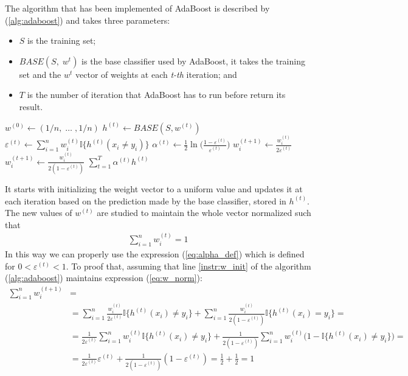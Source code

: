 The algorithm that has been implemented of AdaBoost is described by (\ref{alg:adaboost}) and takes three parameters:
\begin{itemize}
	\item $S$ is the training set;
	\item $BASE(S,\;w^{t})$ is the base classifier used by AdaBoost, it takes the training set and the $w^{t}$ vector of weights at each \textit{t-th} iteration; and
	\item $T$ is the number of iteration that AdaBoost has to run before return its result.
\end{itemize}
\begin{algorithm}[htpb]
	\caption{}
	\label{alg:adaboost}
	\begin{algorithmic}[1]
		\State $w^{(0)} \gets (1/n,\;\dots\;,1/n)$ \label{instr:w_init}
			\State $h^{(t)} \gets BASE(S, w^{(t)})$
			\State $\varepsilon^{(t)} \gets \sum_{i=1}^{n}w_{i}^{(t)}\mathbb{I}\lbrace h^{(t)}(x_{i} \neq y_{i}) \rbrace $
			\State $\alpha^{(t)} \gets \frac{1}{2}\ln\Big(\frac{1-\varepsilon^{(t)}}{\varepsilon^{(t)}}\Big)$
					\State $w_{i}^{(t+1)}\gets\frac{w_{i}^{(t)}}{2\varepsilon^{(t)}}$
				\Else
					\State $w_{i}^{(t+1)}\gets\frac{w_{i}^{(t)}}{2(1-\varepsilon^{(t)})}$
				\EndIf
			\EndFor
		\EndFor
		\Return $\sum_{t=1}^{T}\alpha^{(t)}h^{(t)}$
		\EndProcedure
	\end{algorithmic}
\end{algorithm}
It starts with initializing the weight vector to a uniform value and updates it at each iteration based on the prediction made by the base classifier, stored in $h^{(t)}$. The new values of $w^{(t)}$ are studied to maintain the whole vector normalized such that
\begin{align}
	\label{eq:w_norm}
	\sum_{i=1}^{n}w^{(t)}_{i} = 1
\end{align}
In this way we can properly use the expression (\ref{eq:alpha_def}) which is defined for $0 < \varepsilon^{(t)} < 1$.
To proof that, assuming that line \ref{instr:w_init} of the algorithm (\ref{alg:adaboost}) maintains expression (\ref{eq:w_norm}):
\begin{equation*}
\begin{split}
	\sum_{i=1}^{n}w_{i}^{(t+1)} & = \\
	& = \sum_{i=1}^{n}\frac{w_{i}^{(t)}}{2\varepsilon^{(t)}}\mathbb{I}
		\lbrace 
			h^{(t)}(x_{i}) \neq y_{i}
		\rbrace 
	+
	\sum_{i=1}^{n}\frac{w_{i}^{(t)}}{2(1-\varepsilon^{(t)})}\mathbb{I}
	\lbrace
		h^{(t)}(x_{i}) = y_{i}
	\rbrace = \\ 
	& = \frac{1}{2\varepsilon^{(t)}}\sum_{i=1}^{n}w_{i}^{(t)}\mathbb{I}
	\lbrace 
		h^{(t)}(x_{i}) \neq y_{i} 
	\rbrace 
	+ 
	\frac{1}{2(1-\varepsilon^{(t)})}\sum_{i=1}^{n}w_{i}^{(t)}
	\big(
		1-\mathbb{I} \lbrace
			{h^{(t)}}(x_{i}) \neq y_{i}
		\rbrace
	\big) = \\ 
	& = \frac{1}{2\varepsilon^{(t)}}\varepsilon^{(t)}+\frac{1}{2(1-\varepsilon^{(t)})}
	(
		1-\varepsilon^{(t)}
	) =
	\frac{1}{2} + \frac{1}{2} = 1
\end{split}
\end{equation*}






